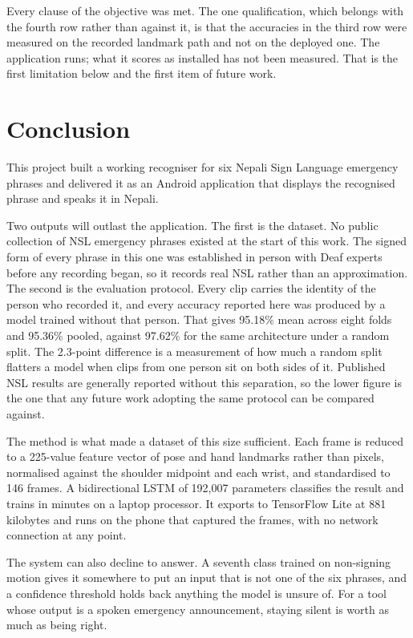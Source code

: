\noindent Every clause of the objective was met. The one qualification, which belongs with the fourth row rather than against it, is that the accuracies in the third row were measured on the recorded landmark path and not on the deployed one. The application runs; what it scores as installed has not been measured. That is the first limitation below and the first item of future work.

\section{Conclusion}

This project built a working recogniser for six Nepali Sign Language emergency phrases and delivered it as an Android application that displays the recognised phrase and speaks it in Nepali.

Two outputs will outlast the application. The first is the dataset. No public collection of NSL emergency phrases existed at the start of this work. The signed form of every phrase in this one was established in person with Deaf experts before any recording began, so it records real NSL rather than an approximation. The second is the evaluation protocol. Every clip carries the identity of the person who recorded it, and every accuracy reported here was produced by a model trained without that person. That gives 95.18\% mean across eight folds and 95.36\% pooled, against 97.62\% for the same architecture under a random split. The 2.3-point difference is a measurement of how much a random split flatters a model when clips from one person sit on both sides of it. Published NSL results are generally reported without this separation, so the lower figure is the one that any future work adopting the same protocol can be compared against.

The method is what made a dataset of this size sufficient. Each frame is reduced to a 225-value feature vector of pose and hand landmarks rather than pixels, normalised against the shoulder midpoint and each wrist, and standardised to 146 frames. A bidirectional LSTM of 192{,}007 parameters classifies the result and trains in minutes on a laptop processor. It exports to TensorFlow Lite at 881 kilobytes and runs on the phone that captured the frames, with no network connection at any point.

The system can also decline to answer. A seventh class trained on non-signing motion gives it somewhere to put an input that is not one of the six phrases, and a confidence threshold holds back anything the model is unsure of. For a tool whose output is a spoken emergency announcement, staying silent is worth as much as being right.

